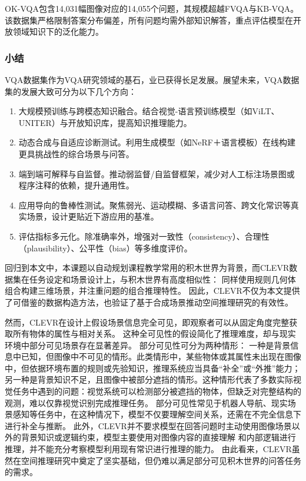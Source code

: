 OK-VQA\cite{marino2019ok}包含14,031幅图像对应的14,055个问题，其规模超越FVQA与KB-VQA。该数据集严格限制答案分布偏差，所有问题均需外部知识解答，重点评估模型在开放领域知识下的泛化能力。
\subsubsection{小结}
VQA数据集作为VQA研究领域的基石，业已获得长足发展。展望未来，VQA数据集的发展大致可分为以下几个方向：
\begin{enumerate}[nosep]
\item 大规模预训练与跨模态知识融合。结合视觉-语言预训练模型（如ViLT、UNITER）与开放知识库，提高知识推理能力。
\item 动态合成与自适应诊断测试。利用生成模型（如NeRF＋语言模板）在线构建更具挑战性的综合场景与问答。
\item 端到端可解释与自监督。推动弱监督/自监督框架，减少对人工标注场景图或程序注释的依赖，提升通用性。
\item 应用导向的鲁棒性测试。聚焦弱光、运动模糊、多语言问答、跨文化常识等真实场景，设计更贴近下游应用的基准。
\item 评估指标多元化。除准确率外，增强对一致性（consistency）、合理性（plausibility）、公平性（bias）等多维度评价。
\end{enumerate}

回归到本文中，本课题以自动规划课程教学常用的积木世界为背景，而CLEVR数据集在任务设定和场景设计上，与积木世界有高度相似性：
同样使用规则几何体组合构建三维场景，并注重问题的组合推理特性。
因此，CLEVR不仅为本文提供了可借鉴的数据构造方法，也验证了基于合成场景推动空间推理研究的有效性。

然而，CLEVR在设计上假设场景信息完全可见，即观察者可以从固定角度完整获取所有物体的属性与相对关系。
这种全可见性的假设简化了推理难度，却与现实环境中部分可见场景存在显著差异。
部分可见性可分为两种情形：
一种是背景信息中已知，但图像中不可见的情形。此类情形中，某些物体或其属性未出现在图像中，但依据环境布置的规则或先验知识，推理系统应当具备“补全”或“外推”能力；
另一种是背景知识不足，且图像中被部分遮挡的情形。这种情形代表了多数实际视觉任务中遇到的问题：视觉系统可以检测部分被遮挡的物体，但缺乏对完整结构的观测，难以仅靠视觉识别完成推理任务。
部分可见性常见于机器人导航、现实场景感知等任务中，在这种情况下，模型不仅要理解空间关系，还需在不完全信息下进行补全与推断。
此外，CLEVR并不要求模型在回答问题时主动使用图像场景以外的背景知识或逻辑约束，模型主要使用对图像内容的直接理解
和内部逻辑进行推理，并不能充分考察模型利用现有常识进行推理的能力。
由此看来，CLEVR虽然在空间推理研究中奠定了坚实基础，但仍难以满足部分可见积木世界的问答任务的需求。

